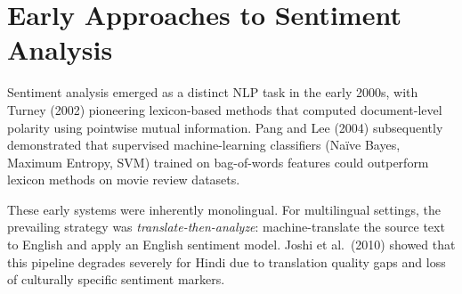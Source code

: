 \section{Early Approaches to Sentiment Analysis}

Sentiment analysis emerged as a distinct NLP task in the early 2000s, with Turney (2002) \cite{turney2002} pioneering lexicon-based methods that computed document-level polarity using pointwise mutual information. Pang and Lee (2004) \cite{panglee2004} subsequently demonstrated that supervised machine-learning classifiers (Na\"ive Bayes, Maximum Entropy, SVM) trained on bag-of-words features could outperform lexicon methods on movie review datasets.

These early systems were inherently monolingual. For multilingual settings, the prevailing strategy was \emph{translate-then-analyze}: machine-translate the source text to English and apply an English sentiment model. Joshi et al.\ (2010) \cite{joshi2010} showed that this pipeline degrades severely for Hindi due to translation quality gaps and loss of culturally specific sentiment markers.
